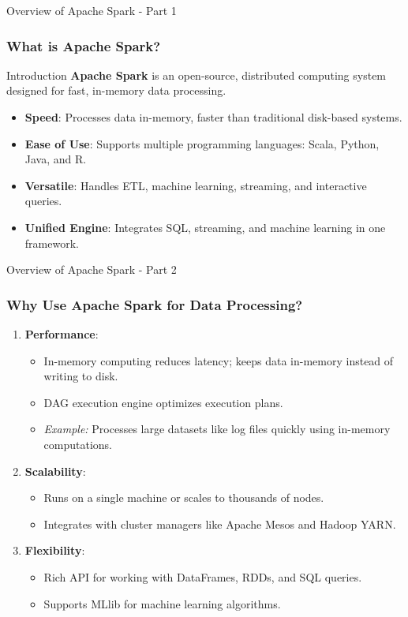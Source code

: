 \documentclass[aspectratio=169]{beamer}
\begin{document}
\begin{frame}[fragile]{Overview of Apache Spark - Part 1}
    \frametitle{What is Apache Spark?}
    \begin{block}{Introduction}
        \textbf{Apache Spark} is an open-source, distributed computing system designed for fast, in-memory data processing.
    \end{block}
    
    \begin{itemize}
        \item \textbf{Speed}: Processes data in-memory, faster than traditional disk-based systems.
        \item \textbf{Ease of Use}: Supports multiple programming languages: Scala, Python, Java, and R.
        \item \textbf{Versatile}: Handles ETL, machine learning, streaming, and interactive queries.
        \item \textbf{Unified Engine}: Integrates SQL, streaming, and machine learning in one framework.
    \end{itemize}
\end{frame}

\begin{frame}[fragile]{Overview of Apache Spark - Part 2}
    \frametitle{Why Use Apache Spark for Data Processing?}
    \begin{enumerate}
        \item \textbf{Performance}:
            \begin{itemize}
                \item In-memory computing reduces latency; keeps data in-memory instead of writing to disk.
                \item DAG execution engine optimizes execution plans.
                \item \textit{Example:} Processes large datasets like log files quickly using in-memory computations.
            \end{itemize}
        \item \textbf{Scalability}:
            \begin{itemize}
                \item Runs on a single machine or scales to thousands of nodes.
                \item Integrates with cluster managers like Apache Mesos and Hadoop YARN.
            \end{itemize}
        \item \textbf{Flexibility}:
            \begin{itemize}
                \item Rich API for working with DataFrames, RDDs, and SQL queries.
                \item Supports MLlib for machine learning algorithms.
            \end{itemize}
    \end{enumerate}
\end{frame}
\end{document}
